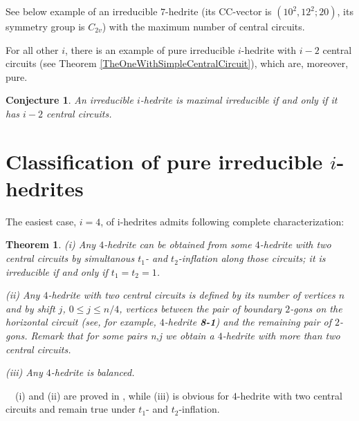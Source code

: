\documentclass[12pt]{article}
\newtheorem{theorem}{Theorem}
\newtheorem{conjecture}{Conjecture}
\newcommand{\proof}{\noindent{\bf Proof.}\ \ }
\begin{document}
See below example of an irreducible $7$-hedrite (its CC-vector is $(10^2, 12^2; 20)$, its symmetry group is $C_{2v}$) with the maximum number of central circuits.


\begin{center}
\epsfxsize=60mm
\end{center}

For all other $i$, there is an example of pure irreducible $i$-hedrite with $i-2$ central circuits (see 
Theorem \ref{TheOneWithSimpleCentralCircuit}), which are, moreover, pure.















\begin{conjecture}
An irreducible $i$-hedrite is maximal irreducible if and only if it has $i-2$ central circuits.
\end{conjecture}



\section{Classification of pure irreducible $i$-hedrites}
The easiest case, $i=4$, of i-hedrites admits following complete
characterization:

\begin{theorem}\label{Theorem-for-4-hedrite}
(i) Any $4$-hedrite can be obtained from some $4$-hedrite with two central
circuits by simultanous $t_1$- and $t_2$-inflation along those circuits; it is
irreducible if and only if $t_1=t_2=1$.

(ii) Any $4$-hedrite with two central circuits is defined by
its number of vertices $n$ and by {\em shift} $j$, $0 \le j \le n/4$,
vertices between the pair of boundary $2$-gons on the horizontal
circuit (see, for example, $4$-hedrite {\bf 8-1}) and the remaining
pair of $2$-gons. Remark that for some pairs n,j  we obtain a 
$4$-hedrite with more than two central circuits.

(iii) Any $4$-hedrite is balanced.

\end{theorem}
\proof (i) and (ii) are proved in \cite{DSt}, 
while (iii) is obvious for $4$-hedrite with two central circuits
and remain true under $t_1$- and $t_2$-inflation.
\end{document}
